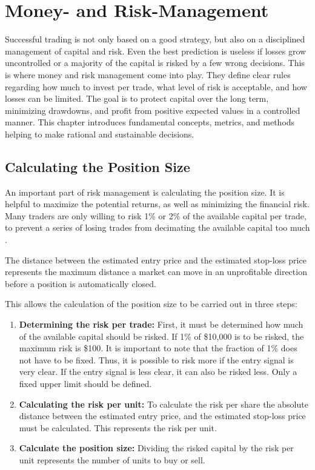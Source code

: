 \section{Money- and Risk-Management}
\label{chap:risk-man}

Successful trading is not only based on a good strategy, but also on a disciplined management of capital and risk.
Even the best prediction is useless if losses grow uncontrolled or a majority of the capital is risked by a few wrong decisions.
This is where money and risk management come into play.
They define clear rules regarding how much to invest per trade, what level of risk is acceptable, and how losses can be limited.
The goal is to protect capital over the long term, minimizing drawdowns, and profit from positive expected values in a controlled manner.
This chapter introduces fundamental concepts, metrics, and methods helping to make rational and sustainable decisions.

\subsection{Calculating the Position Size}

An important part of risk management is calculating the position size.
It is helpful to maximize the potential returns, as well as minimizing the financial risk.
Many traders are only willing to risk 1\% or 2\% of the available capital per trade, to prevent a series of losing trades from decimating the available capital too much \cite{1-2-prozent}.

The distance between the estimated entry price and the estimated stop-loss price represents the maximum distance a market can move in an unprofitable direction before a position is automatically closed.

This allows the calculation of the position size to be carried out in three steps:

\begin{enumerate}
    \item \textbf{Determining the risk per trade:} First, it must be determined how much of the available capital should be risked.
    If 1\% of \$10,000 is to be risked, the maximum risk is \$100.
    It is important to note that the fraction of 1\% does not have to be fixed.
    Thus, it is possible to risk more if the entry signal is very clear.
    If the entry signal is less clear, it can also be risked less.
    Only a fixed upper limit should be defined.
    \item \textbf{Calculating the risk per unit:} To calculate the risk per share the absolute distance between the estimated entry price, and the estimated stop-loss price must be calculated.
    This represents the risk per unit.
    \item \textbf{Calculate the position size:} Dividing the risked capital by the risk per unit represents the number of units to buy or sell.
\end{enumerate}

